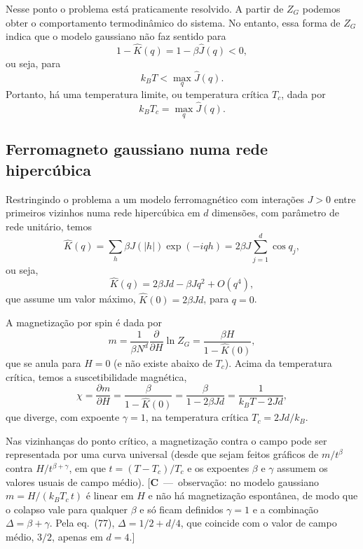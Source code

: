 \documentclass[12pt,a4paper]{article}
\newcommand{\Kh}{\widehat{K}}
\newcommand{\Jh}{\widehat{J}}
\newcounter{corr}
\newcommand{\nota}[2]{\refstepcounter{corr}\label{#1}%
  {\color{red}\small[\textbf{C\thecorr}~---~#2]}}
\begin{document}
Nesse ponto o problema está praticamente resolvido. A partir de $Z_G$
podemos obter o comportamento termodinâmico do sistema. No entanto,
essa forma de $Z_G$ indica que o modelo gaussiano não faz sentido para
\begin{equation}
1-\Kh(q)=1-\beta\Jh(q)<0,
\end{equation}
ou seja, para
\begin{equation}
k_BT<\max_q\Jh(q).
\end{equation}
Portanto, há uma temperatura limite, ou temperatura crítica $T_c$, dada por
\begin{equation}
k_BT_c=\max_q\Jh(q).
\end{equation}

\subsection{Ferromagneto gaussiano numa rede hipercúbica}

Restringindo o problema a um modelo ferromagnético com interações $J>0$
entre primeiros vizinhos numa rede hipercúbica em $d$ dimensões, com
parâmetro de rede unitário, temos
\begin{equation}
\Kh(q)=\sum_h\beta J\left(|h|\right)\exp\left(-iqh\right)=2\beta J\sum_{j=1}^d\cos q_j,
\end{equation}
ou seja,
\begin{equation}
\Kh(q)=2\beta Jd-\beta Jq^2+O\left(q^4\right),
\end{equation}
que assume um valor máximo, $\Kh(0)=2\beta Jd$, para $q=0$.

A magnetização por spin é dada por
\begin{equation}
m=\frac{1}{\beta N^d}\frac{\partial}{\partial H}\ln Z_G=\frac{\beta H}{1-\Kh(0)},
\end{equation}
que se anula para $H=0$ (e não existe abaixo de $T_c$). Acima da temperatura
crítica, temos a suscetibilidade magnética,
\begin{equation}
\chi=\frac{\partial m}{\partial H}=\frac{\beta}{1-\Kh(0)}=\frac{\beta}{1-2\beta Jd}=\frac{1}{k_BT-2Jd},
\end{equation}
que diverge, com expoente $\gamma=1$, na temperatura crítica $T_c=2Jd/k_B$.

Nas vizinhanças do ponto crítico, a magnetização contra o campo pode
ser representada por uma curva universal (desde que sejam feitos gráficos de
$m/t^{\beta}$ contra $H/t^{\beta+\gamma}$, em que $t=\left(T-T_c\right)/T_c$ e os expoentes $\beta$ e $\gamma$ assumem
os valores usuais de campo médio).
\nota{c:scal}{observação: no modelo gaussiano $m=H/(k_BT_c\,t)$ é linear em $H$ e
não há magnetização espontânea, de modo que o colapso vale para qualquer $\beta$
e só ficam definidos $\gamma=1$ e a combinação $\Delta=\beta+\gamma$. Pela eq.~(77),
$\Delta=1/2+d/4$, que coincide com o valor de campo médio, $3/2$, apenas em $d=4$.}
\end{document}
